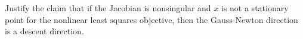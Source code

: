\documentclass[12pt, leqno]{article}
\begin{document}

Justify the claim that if the Jacobian is nonsingular and $x$ is not a
stationary point for the nonlinear least squares objective, then the
Gauss-Newton direction is a descent direction.
\end{document}
